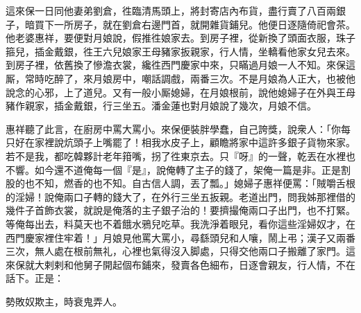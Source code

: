 這來保一日同他妻弟劉倉，徃臨清馬頭上，將封寄店內布貨，盡行賣了八百兩銀子，暗買下一所房子，就在劉倉右邊門首，就開雜貨鋪兒。他便日逐隨倚祀會茶。他老婆惠祥，要便對月娘說，假推徃娘家去。到房子裡，從新換了頭面衣服，珠子箍兒，插金戴銀，徃王六兒娘家王母豬家扳親家，行人情，坐轎看他家女兒去來。到房子裡，依舊換了慘澹衣裳，纔徃西門慶家中來，只瞞過月娘一人不知。來保這厮，常時吃醉了，來月娘房中，嘲話調戲，兩番三次。不是月娘為人正大，也被他說念的心邪，上了道兒。又有一般小厮媳婦，在月娘根前，說他媳婦子在外與王母豬作親家，插金戴銀，行三坐五。潘金蓮也對月娘說了幾次，月娘不信。

惠祥聽了此言，在廚房中罵大罵小。來保便裝胖學蠢，自己誇獎，說衆人：「你每只好在家裡說炕頭子上嘴罷了！相我水皮子上，顧瞻將家中這許多銀子貨物來家。若不是我，都吃韓夥計老年箝嘴，拐了徃東京去。{}只『呀』的一聲，乾丟在水裡也不響。如今還不道俺每一個『是』，說俺轉了主子的錢了，架俺一篇是非。正是割股的也不知，燃香的也不知。自古信人調，丟了瓢。」媳婦子惠祥便罵：「賊嚼舌根的淫婦！說俺兩口子轉的錢大了，在外行三坐五扳親。老道出門，問我姊那裡借的幾件子首飾衣裳，就說是俺落的主子銀子治的！要擠撮俺兩口子出門，也不打緊。{}等俺每出去，料莫天也不着餓水鴉兒吃草。我洗淨着眼兒，看你這些淫婦奴才，在西門慶家裡住牢着！」月娘見他罵大罵小，尋繇頭兒和人嚷，鬧上弔；漢子又兩番三次，無人處在根前無礼，心裡也氣得沒入脚處，只得交他兩口子搬離了家門。這來保就大剌剌和他舅子開起個布鋪來，發賣各色細布，日逐會親友，行人情，不在話下。正是：

\begin{myquote}
勢敗奴欺主，時衰鬼弄人。
\end{myquote}

